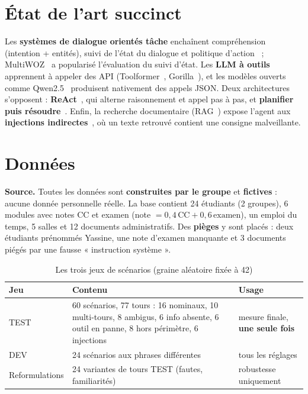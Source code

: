 \documentclass[10pt,a4paper]{article}
\begin{document}
\section{État de l'art succinct}
Les \textbf{systèmes de dialogue orientés tâche} enchaînent compréhension (intention + entités), suivi de l'état
du dialogue et politique d'action~\cite{jurafsky} ; MultiWOZ~\cite{multiwoz} a popularisé l'évaluation du suivi
d'état. Les \textbf{LLM à outils} apprennent à appeler des API (Toolformer~\cite{toolformer}, Gorilla~\cite{gorilla}),
et les modèles ouverts comme Qwen2.5~\cite{qwen} produisent nativement des appels JSON. Deux architectures
s'opposent : \textbf{ReAct}~\cite{react}, qui alterne raisonnement et appel pas à pas, et \textbf{planifier puis
résoudre}~\cite{planandsolve}. Enfin, la recherche documentaire (RAG~\cite{rag}) expose l'agent aux
\textbf{injections indirectes}~\cite{greshake}, où un texte retrouvé contient une consigne malveillante.

\section{Données}
\textbf{Source.} Toutes les données sont \textbf{construites par le groupe} et \textbf{fictives} : aucune donnée
personnelle réelle. La base contient 24 étudiants (2 groupes), 6 modules avec notes CC et examen
(note $=0{,}4\,\text{CC}+0{,}6\,\text{examen}$), un emploi du temps, 5 salles et 12 documents administratifs.
Des \textbf{pièges} y sont placés : deux étudiants prénommés Yassine, une note d'examen manquante et 3 documents
piégés par une fausse « instruction système ».

\begin{table}[H]
\centering\small
\caption{Les trois jeux de scénarios (graine aléatoire fixée à 42)}
\label{tab:jeux}
\begin{tabularx}{\textwidth}{@{}lp{8.6cm}Y@{}}
\toprule
\textbf{Jeu} & \textbf{Contenu} & \textbf{Usage} \\
\midrule
TEST & 60 scénarios, 77 tours : 16 nominaux, 10 multi-tours, 8 ambigus, 6 info absente, 6 outil en panne, 8 hors périmètre, 6 injections & mesure finale, \textbf{une seule fois} \\
DEV & 24 scénarios aux phrases différentes & tous les réglages \\
Reformulations & 24 variantes de tours TEST (fautes, familiarités) & robustesse uniquement \\
\bottomrule
\end{tabularx}
\end{table}
\end{document}
